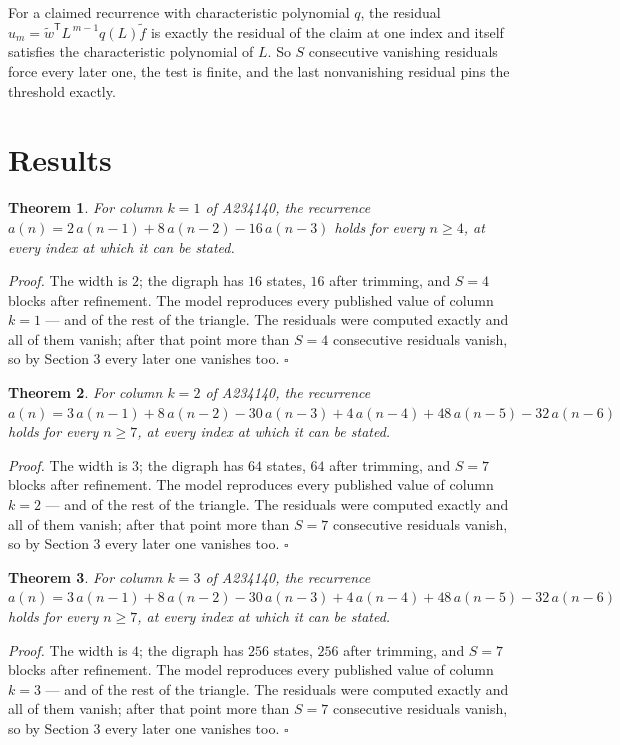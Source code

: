 \documentclass[11pt]{article}
\newtheorem{theorem}{Theorem}
\theoremstyle{definition}
\begin{document}
For a claimed recurrence with characteristic polynomial $q$, the residual $u_m = \tilde w^{\mathsf T}L^{\,m-1}q(L)\tilde f$ is exactly the residual of the claim at one index and itself satisfies the characteristic polynomial of $L$. So $S$ consecutive vanishing residuals force every later one, the test is finite, and the last nonvanishing residual pins the threshold exactly.

\section{Results}

\begin{theorem} For column $k = 1$ of A234140, the recurrence $a(n) = 2\,a(n-1) + 8\,a(n-2) - 16\,a(n-3)$ holds for every $n \ge 4$, at every index at which it can be stated.\end{theorem}

{\itshape Proof.} The width is $2$; the digraph has $16$ states, $16$ after trimming, and $S = 4$ blocks after refinement. The model reproduces every published value of column $k = 1$ --- and of the rest of the triangle. The residuals were computed exactly and all of them vanish; after that point more than $S = 4$ consecutive residuals vanish, so by Section 3 every later one vanishes too. $\square$

\begin{theorem} For column $k = 2$ of A234140, the recurrence $a(n) = 3\,a(n-1) + 8\,a(n-2) - 30\,a(n-3) + 4\,a(n-4) + 48\,a(n-5) - 32\,a(n-6)$ holds for every $n \ge 7$, at every index at which it can be stated.\end{theorem}

{\itshape Proof.} The width is $3$; the digraph has $64$ states, $64$ after trimming, and $S = 7$ blocks after refinement. The model reproduces every published value of column $k = 2$ --- and of the rest of the triangle. The residuals were computed exactly and all of them vanish; after that point more than $S = 7$ consecutive residuals vanish, so by Section 3 every later one vanishes too. $\square$

\begin{theorem} For column $k = 3$ of A234140, the recurrence $a(n) = 3\,a(n-1) + 8\,a(n-2) - 30\,a(n-3) + 4\,a(n-4) + 48\,a(n-5) - 32\,a(n-6)$ holds for every $n \ge 7$, at every index at which it can be stated.\end{theorem}

{\itshape Proof.} The width is $4$; the digraph has $256$ states, $256$ after trimming, and $S = 7$ blocks after refinement. The model reproduces every published value of column $k = 3$ --- and of the rest of the triangle. The residuals were computed exactly and all of them vanish; after that point more than $S = 7$ consecutive residuals vanish, so by Section 3 every later one vanishes too. $\square$
\end{document}
